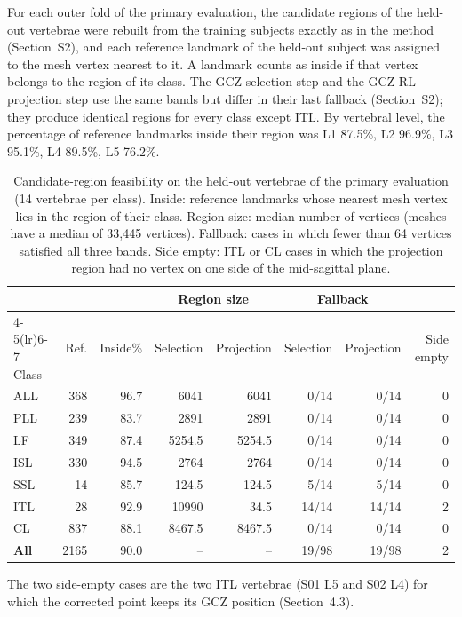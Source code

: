 \documentclass[10pt,a4paper]{article}
\begin{document}
For each outer fold of the primary evaluation, the candidate regions of the held-out vertebrae were rebuilt from the training subjects exactly as in the method (Section~S2), and each reference landmark of the held-out subject was assigned to the mesh vertex nearest to it. A landmark counts as inside if that vertex belongs to the region of its class. The GCZ selection step and the GCZ-RL projection step use the same bands but differ in their last fallback (Section~S2); they produce identical regions for every class except ITL. By vertebral level, the percentage of reference landmarks inside their region was L1 87.5\%, L2 96.9\%, L3 95.1\%, L4 89.5\%, L5 76.2\%.

\begin{table}[h]
\centering
\small
\caption{Candidate-region feasibility on the held-out vertebrae of the primary evaluation (14 vertebrae per class). Inside: reference landmarks whose nearest mesh vertex lies in the region of their class. Region size: median number of vertices (meshes have a median of 33{,}445 vertices). Fallback: cases in which fewer than 64 vertices satisfied all three bands. Side empty: ITL or CL cases in which the projection region had no vertex on one side of the mid-sagittal plane.}
\label{tab:zones}
\begin{tabular}{@{}lrrrrrrr@{}}
\toprule
 & & & \multicolumn{2}{c}{Region size} & \multicolumn{2}{c}{Fallback} & \\
\cmidrule(lr){4-5}\cmidrule(lr){6-7}
Class & Ref. & Inside\% & Selection & Projection & Selection & Projection & Side empty \\
\midrule
ALL & 368 & 96.7 & 6041 & 6041 & 0/14 & 0/14 & 0 \\
PLL & 239 & 83.7 & 2891 & 2891 & 0/14 & 0/14 & 0 \\
LF & 349 & 87.4 & 5254.5 & 5254.5 & 0/14 & 0/14 & 0 \\
ISL & 330 & 94.5 & 2764 & 2764 & 0/14 & 0/14 & 0 \\
SSL & 14 & 85.7 & 124.5 & 124.5 & 5/14 & 5/14 & 0 \\
ITL & 28 & 92.9 & 10990 & 34.5 & 14/14 & 14/14 & 2 \\
CL & 837 & 88.1 & 8467.5 & 8467.5 & 0/14 & 0/14 & 0 \\
\midrule
\textbf{All} & 2165 & 90.0 & -- & -- & 19/98 & 19/98 & 2 \\
\bottomrule
\end{tabular}
\end{table}

The two side-empty cases are the two ITL vertebrae (S01 L5 and S02 L4) for which the corrected point keeps its GCZ position (Section~4.3).
\end{document}
